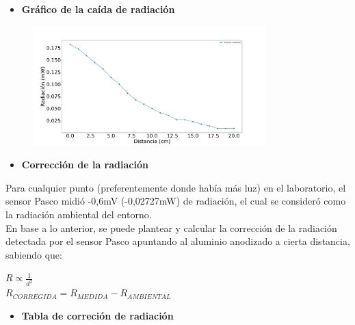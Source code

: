 \documentclass[a4paper]{article}
\begin{document}
		\begin{itemize}
			\vspace{5mm}
			\item \textbf{Gráfico de la caída de radiación}
			\vspace{-3mm}			
		\end{itemize}
	
        \begin{figure}[h!]
			\centering
			\includegraphics[width=9cm]{../imagenes/graficoRadiacionDistancia.png}
		\end{figure}
		
		\begin{itemize}
			\vspace{0mm}
			\item \textbf{Corrección de la radiación}
			\vspace{-3mm}			
		\end{itemize}
		
		\indent Para cualquier punto (preferentemente donde había más luz) en el laboratorio, el sensor Pasco midió -0,6mV (-0,02727mW) de radiación, el cual se consideró como la radiación ambiental del entorno. \\
		\indent En base a lo anterior, se puede plantear y calcular la corrección de la radiación detectada por el sensor Pasco apuntando al aluminio anodizado a cierta distancia, sabiendo que: \\
		
		\begin{center}
			$R \propto \frac{1}{d^2}$ \\
			$R_{CORREGIDA} = R_{MEDIDA} - R_{AMBIENTAL}$ \\
		\end{center}
		
		\newpage
		\noindent
		
		\begin{itemize}
			\vspace{0mm}
			\item \textbf{Tabla de correción de radiación}
			\vspace{-3mm}			
		\end{itemize}
		
\end{document}
